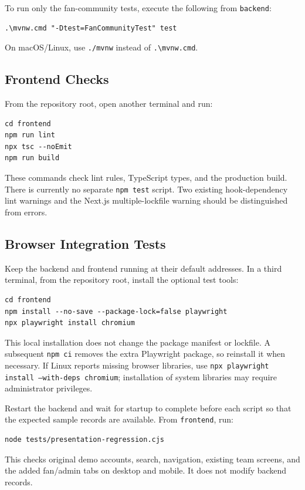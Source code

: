 \documentclass[11pt]{report}
\begin{document}
To run only the fan-community tests, execute the following from \texttt{backend}:
\begin{samepage}
\begin{verbatim}
.\mvnw.cmd "-Dtest=FanCommunityTest" test
\end{verbatim}
\end{samepage}
On macOS/Linux, use \texttt{./mvnw} instead of \texttt{.\textbackslash mvnw.cmd}.

\subsection{Frontend Checks}
From the repository root, open another terminal and run:
\begin{samepage}
\begin{verbatim}
cd frontend
npm run lint
npx tsc --noEmit
npm run build
\end{verbatim}
\end{samepage}
These commands check lint rules, TypeScript types, and the production build. There is currently no separate \texttt{npm test} script. Two existing hook-dependency lint warnings and the Next.js multiple-lockfile warning should be distinguished from errors.

\subsection{Browser Integration Tests}
Keep the backend and frontend running at their default addresses. In a third terminal, from the repository root, install the optional test tools:
\begin{samepage}
\begin{verbatim}
cd frontend
npm install --no-save --package-lock=false playwright
npx playwright install chromium
\end{verbatim}
\end{samepage}
This local installation does not change the package manifest or lockfile. A subsequent \texttt{npm ci} removes the extra Playwright package, so reinstall it when necessary. If Linux reports missing browser libraries, use \texttt{npx playwright install --with-deps chromium}; installation of system libraries may require administrator privileges.

Restart the backend and wait for startup to complete before each script so that the expected sample records are available. From \texttt{frontend}, run:
\begin{samepage}
\begin{verbatim}
node tests/presentation-regression.cjs
\end{verbatim}
\end{samepage}
This checks original demo accounts, search, navigation, existing team screens, and the added fan/admin tabs on desktop and mobile. It does not modify backend records.
\end{document}
